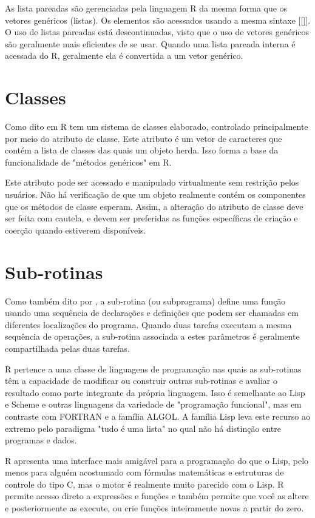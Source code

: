       As lista pareadas são gerenciadas pela linguagem R da mesma forma que os vetores genéricos (listas). Os elementos são acessados usando a mesma sintaxe [[]]. O uso de listas pareadas está descontinuadas, visto que o uso de vetores genéricos são geralmente mais eficientes de se usar. Quando uma lista pareada interna é acessada do R, geralmente ela é convertida a um vetor genérico.
    
  \section{Classes}
  	Como dito em \cite{Team2021b} R tem um sistema de classes elaborado, controlado principalmente por meio do atributo de classe. Este atributo é um vetor de caracteres que contém a lista de classes das quais um objeto herda. Isso forma a base da funcionalidade de "métodos genéricos" em R.
    
    Este atributo pode ser acessado e manipulado virtualmente sem restrição pelos usuários. Não há verificação de que um objeto realmente contém os componentes que os métodos de classe esperam. Assim, a alteração do atributo de classe deve ser feita com cautela, e devem ser preferidas as funções específicas de criação e coerção quando estiverem disponíveis.
    
  \section{Sub-rotinas}
    Como também dito por \cite{Team2021b}, a sub-rotina (ou subprograma) define uma função usando uma sequência de declarações e definições que podem ser chamadas em diferentes localizações do programa. Quando duas tarefas executam a mesma sequência de operações, a sub-rotina associada a estes parâmetros é geralmente compartilhada pelas duas tarefas.
    
    R pertence a uma classe de linguagens de programação nas quais as sub-rotinas têm a capacidade de modificar ou construir outras sub-rotinas e avaliar o resultado como parte integrante da própria linguagem. Isso é semelhante ao Lisp e Scheme e outras linguagens da variedade de "programação funcional", mas em contraste com FORTRAN e a família ALGOL. A família Lisp leva este recurso ao extremo pelo paradigma "tudo é uma lista" no qual não há distinção entre programas e dados.
    
    R apresenta uma interface mais amigável para a programação do que o Lisp, pelo menos para alguém acostumado com fórmulas matemáticas e estruturas de controle do tipo C, mas o motor é realmente muito parecido com o Lisp. R permite acesso direto a expressões e funções e também permite que você as altere e posteriormente as execute, ou crie funções inteiramente novas a partir do zero.

